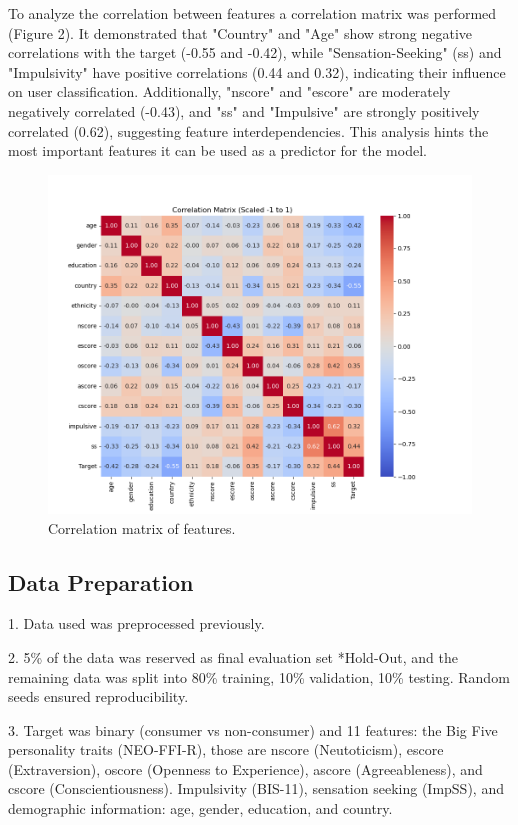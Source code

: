 \documentclass{article}
\begin{document}
To analyze the correlation between features a correlation matrix was performed (Figure 2). It demonstrated that "Country" and "Age" show strong negative correlations with the target (-0.55 and -0.42), while "Sensation-Seeking" (ss) and "Impulsivity" have positive correlations (0.44 and 0.32), indicating their influence on user classification. Additionally, "nscore" and "escore" are moderately negatively correlated (-0.43), and "ss" and "Impulsive" are strongly positively correlated (0.62), suggesting feature interdependencies. This analysis hints the most important features it can be used as a predictor for the model.

\begin{figure}[h!]
    \centering
    \includegraphics[width=\textwidth]{correlation-matrixpng.png}
    \caption{Correlation matrix of features.}
    \label{fig:correlation-matrix}
\end{figure}

\subsection*{Data Preparation}

1. Data used was preprocessed previously.

2. 5\% of the data was reserved as final evaluation set *Hold-Out, and the remaining data was split into 80\% training, 10\% validation, 10\% testing. Random seeds ensured reproducibility.

3. Target was binary (consumer vs non-consumer) and 11 features: the Big Five personality traits (NEO-FFI-R), those are nscore (Neutoticism), escore (Extraversion), oscore (Openness to Experience), ascore (Agreeableness), and cscore (Conscientiousness). Impulsivity (BIS-11), sensation seeking (ImpSS), and demographic information: age, gender, education, and country.
\end{document}
